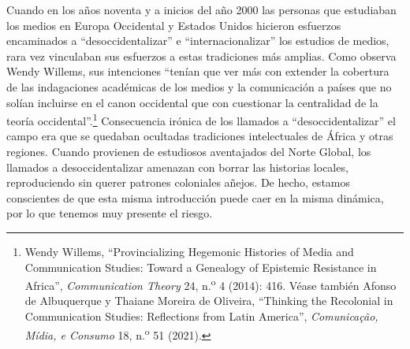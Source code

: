 \documentclass{tufte-handout}
\begin{document}
Cuando en los años noventa y a inicios del año 2000 las personas que
estudiaban los medios en Europa Occidental y Estados Unidos hicieron
esfuerzos encaminados a ``desoccidentalizar'' e ``internacionalizar''
los estudios de medios, rara vez vinculaban sus esfuerzos a estas
tradiciones más amplias. Como observa Wendy Willems, sus intenciones
``tenían que ver más con extender la cobertura de las indagaciones
académicas de los medios y la comunicación a países que no solían
incluirse en el canon occidental que con cuestionar la centralidad de la
teoría occidental''.\footnote{Wendy Willems, ``Provincializing Hegemonic
  Histories of Media and Communication Studies: Toward a Genealogy of
  Epistemic Resistance in Africa'', \emph{Communication Theory} 24,
  n.\textsuperscript{o} 4 (2014): 416. Véase también Afonso de
  Albuquerque y Thaiane Moreira de Oliveira, ``Thinking the Recolonial
  in Communication Studies: Reflections from Latin America'',
  \emph{Comunicação, Mídia, e Consumo} 18, n.\textsuperscript{o} 51
  (2021).} Consecuencia irónica de los llamados a ``desoccidentalizar''
el campo era que se quedaban ocultadas tradiciones intelectuales de
África y otras regiones. Cuando provienen de estudiosos aventajados del
Norte Global, los llamados a desoccidentalizar amenazan con borrar las
historias locales, reproduciendo sin querer patrones coloniales añejos.
De hecho, estamos conscientes de que esta misma introducción puede caer
en la misma dinámica, por lo que tenemos muy presente el riesgo.
\end{document}
